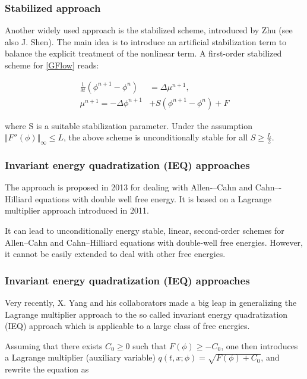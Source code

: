 \documentclass{beamer}
\begin{document}
    \begin{frame}
    \frametitle{Stabilized approach}
Another widely used approach is the stabilized scheme, introduced by Zhu (see also J. Shen). The main idea is to introduce an artificial stabilization term to balance the explicit treatment of the nonlinear term. A first-order stabilized scheme for \ref{GFlow} reads:

\begin{equation}\label{Stabilized approach}
  \begin{split}
\frac{1}{\delta t}(\phi^{n+1}-\phi^n) &= \Delta \mu^{n+1},\\
\mu^{n+1} = -\Delta\phi^{n+1}&+S(\phi^{n+1}-\phi^n)+F
  \end{split}
\end{equation}

where S is a suitable stabilization parameter. Under the assumption $\Vert F''(\phi)\Vert_\infty\leq L$, the above scheme is unconditionally stable for all $S \geq \frac{L}{2}$.

    \end{frame}

    \begin{frame}
    \frametitle{Invariant energy quadratization (IEQ) approaches}
	
The approach is proposed in 2013 for dealing with Allen-–Cahn and Cahn–-Hilliard equations with double well free energy. It is based on a Lagrange multiplier approach introduced in 2011.

It can lead to unconditionally energy stable, linear, second-order schemes for Allen–Cahn and Cahn–Hilliard equations with double-well free energies. However, it cannot be easily extended to deal with other free energies. 


	
\end{frame}

    \begin{frame}
    \frametitle{Invariant energy quadratization (IEQ) approaches}
Very recently, X. Yang and his collaborators  made a big leap in generalizing the Lagrange multiplier approach to the so called invariant energy quadratization (IEQ) approach which is applicable to a large class of free energies.	

Assuming that there exists $C_0 \geq 0$ such that $F(\phi) \geq -C_0$, one then introduces a Lagrange multiplier (auxiliary variable) $q(t,x;\phi)=\sqrt{F(\phi)+C_0}$, and rewrite the equation as
	\end{frame}
\end{document}
